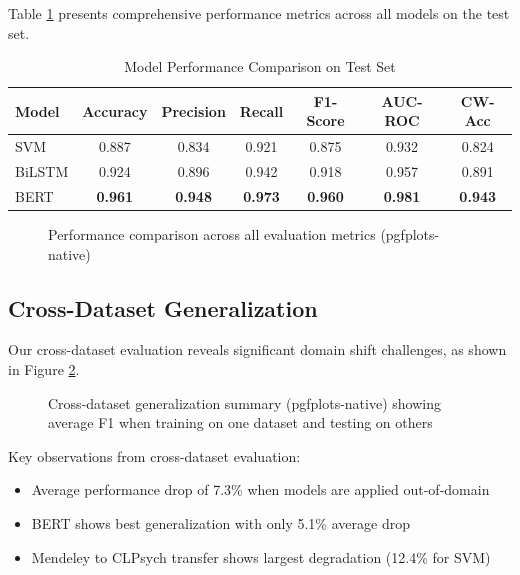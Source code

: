 \documentclass[conference]{IEEEtran}
\begin{document}
Table \ref{tab:performance} presents comprehensive performance metrics across all models on the test set.

\begin{table}[H]
\centering
\caption{Model Performance Comparison on Test Set}
\label{tab:performance}
{\scriptsize
\setlength{\tabcolsep}{4pt}
\begin{tabular}{@{}lcccccc@{}}
\toprule
\textbf{Model} & \textbf{Accuracy} & \textbf{Precision} & \textbf{Recall} & \textbf{F1-Score} & \textbf{AUC-ROC} & \textbf{CW-Acc} \\
\midrule
SVM & 0.887 & 0.834 & 0.921 & 0.875 & 0.932 & 0.824 \\
BiLSTM & 0.924 & 0.896 & 0.942 & 0.918 & 0.957 & 0.891 \\
BERT & \textbf{0.961} & \textbf{0.948} & \textbf{0.973} & \textbf{0.960} & \textbf{0.981} & \textbf{0.943} \\
\bottomrule
\end{tabular}
}
\end{table}

\begin{figure}[H]
    \centering
    \PerformanceBarsPlot
    \caption{Performance comparison across all evaluation metrics (pgfplots-native)}
    \label{fig:performance}
\end{figure}

\subsection{Cross-Dataset Generalization}

Our cross-dataset evaluation reveals significant domain shift challenges, as shown in Figure \ref{fig:crossdataset}.

\begin{figure}[H]
    \centering
    \CrossDatasetBars
    \caption{Cross-dataset generalization summary (pgfplots-native) showing average F1 when training on one dataset and testing on others}
    \label{fig:crossdataset}
\end{figure}

Key observations from cross-dataset evaluation:
\begin{itemize}
    \item Average performance drop of 7.3\% when models are applied out-of-domain
    \item BERT shows best generalization with only 5.1\% average drop
    \item Mendeley to CLPsych transfer shows largest degradation (12.4\% for SVM)
\end{itemize}
\end{document}
